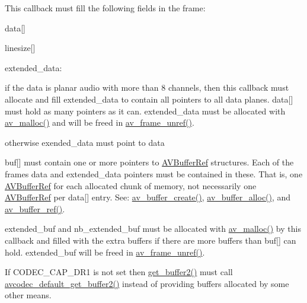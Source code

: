 This callback must fill the following fields in the frame\+:
\begin{DoxyItemize}
\item data\mbox{[}\mbox{]}
\item linesize\mbox{[}\mbox{]}
\item extended\+\_\+data\+:
\begin{DoxyItemize}
\item if the data is planar audio with more than 8 channels, then this callback must allocate and fill extended\+\_\+data to contain all pointers to all data planes. data\mbox{[}\mbox{]} must hold as many pointers as it can. extended\+\_\+data must be allocated with \hyperlink{group__lavu__mem_gacbca30ebc510a7e4156d66e7aceb2dc8}{av\+\_\+malloc()} and will be freed in \hyperlink{group__lavu__frame_ga0a2b687f9c1c5ed0089b01fd61227108}{av\+\_\+frame\+\_\+unref()}.
\item otherwise exended\+\_\+data must point to data
\end{DoxyItemize}
\item buf\mbox{[}\mbox{]} must contain one or more pointers to \hyperlink{struct_a_v_buffer_ref}{A\+V\+Buffer\+Ref} structures. Each of the frame\textquotesingle{}s data and extended\+\_\+data pointers must be contained in these. That is, one \hyperlink{struct_a_v_buffer_ref}{A\+V\+Buffer\+Ref} for each allocated chunk of memory, not necessarily one \hyperlink{struct_a_v_buffer_ref}{A\+V\+Buffer\+Ref} per data\mbox{[}\mbox{]} entry. See\+: \hyperlink{group__lavu__buffer_ga3e7f4c92db85ccba0b2a16dd0069842a}{av\+\_\+buffer\+\_\+create()}, \hyperlink{group__lavu__buffer_ga5ae84ac902283dea1a660ede06c1cdac}{av\+\_\+buffer\+\_\+alloc()}, and \hyperlink{group__lavu__buffer_gaa40ce7d3ede946a89d03323bbd7268c1}{av\+\_\+buffer\+\_\+ref()}.
\item extended\+\_\+buf and nb\+\_\+extended\+\_\+buf must be allocated with \hyperlink{group__lavu__mem_gacbca30ebc510a7e4156d66e7aceb2dc8}{av\+\_\+malloc()} by this callback and filled with the extra buffers if there are more buffers than buf\mbox{[}\mbox{]} can hold. extended\+\_\+buf will be freed in \hyperlink{group__lavu__frame_ga0a2b687f9c1c5ed0089b01fd61227108}{av\+\_\+frame\+\_\+unref()}.
\end{DoxyItemize}

If C\+O\+D\+E\+C\+\_\+\+C\+A\+P\+\_\+\+D\+R1 is not set then \hyperlink{struct_a_v_codec_context_aef79333a4c6abf1628c55d75ec82bede}{get\+\_\+buffer2()} must call \hyperlink{group__lavc__decoding_ga09dee227d3666720eff1f6913d11699d}{avcodec\+\_\+default\+\_\+get\+\_\+buffer2()} instead of providing buffers allocated by some other means.

